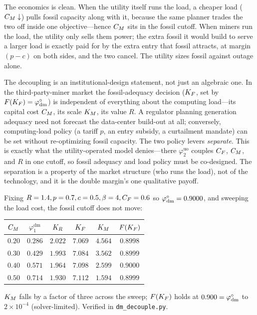 The economics is clean. When the utility itself runs the load, a cheaper load
($C_M\downarrow$) pulls fossil capacity along with it, because the same planner trades the two
off inside one objective---hence $C_M$ sits in the fossil cutoff. When miners run the load,
the utility only sells them power; the extra fossil it would build to serve a larger load is
exactly paid for by the extra entry that fossil attracts, at margin $(p-c)$ on both sides, and
the two cancel. The utility sizes fossil against outage alone.

\begin{corollary}\label{dm-cor:separation}
The decoupling is an institutional-design statement, not just an algebraic one. In the
third-party-miner market the fossil-adequacy decision ($K_F$, set by
$F(K_F)=\varphi^{\circ}_{\mathrm{dm}}$) is independent of everything about the computing load---its
capital cost $C_M$, its scale $K_M$, its value $R$. A regulator planning generation adequacy
need not forecast the data-center build-out at all; conversely, computing-load policy (a tariff
$p$, an entry subsidy, a curtailment mandate) can be set without re-optimizing fossil capacity.
The two policy levers \emph{separate}. This is exactly what the utility-operated model
denies---there $\varphi_2^{\mathrm{uo}}$ couples $C_F$, $C_M$, and $R$ in one cutoff, so fossil
adequacy and load policy must be co-designed. The separation is a property of the market
structure (who runs the load), not of the technology, and it is the double margin's one
qualitative payoff.
\end{corollary}

\begin{remark}\label{dm-rem:decouplenum}
Fixing $R=1.4,p=0.7,c=0.5,\beta=4,C_F=0.6$ so $\varphi^{\circ}_{\mathrm{dm}}=0.9000$, and sweeping the
load cost, the fossil cutoff does not move:
\begin{center}\small
\begin{tabular}{cccccc}
\toprule
$C_M$ & $\varphi_1^{\mathrm{dm}}$ & $K_R$ & $K_F$ & $K_M$ & $F(K_F)$\\
\midrule
$0.20$ & $0.286$ & $2.022$ & $7.069$ & $4.564$ & $0.8998$\\
$0.30$ & $0.429$ & $1.993$ & $7.084$ & $3.562$ & $0.8999$\\
$0.40$ & $0.571$ & $1.964$ & $7.098$ & $2.599$ & $0.9000$\\
$0.50$ & $0.714$ & $1.930$ & $7.112$ & $1.594$ & $0.8999$\\
\bottomrule
\end{tabular}
\end{center}
$K_M$ falls by a factor of three across the sweep; $F(K_F)$ holds at $0.900=\varphi^{\circ}_{\mathrm{dm}}$
to $2\times10^{-4}$ (solver-limited). Verified in \texttt{dm\_decouple.py}.
\end{remark}

